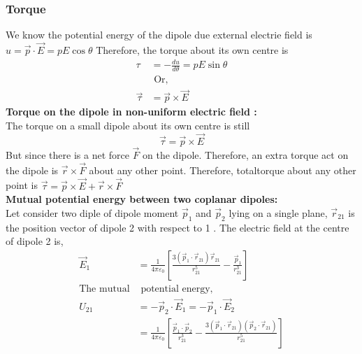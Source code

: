 \subsubsection{Torque}
We know the potential energy of the dipole due external electrie field is $u=\vec{p} \cdot \vec{E}=p E \cos \theta$
Therefore, the torque about its own centre is
$$
\begin{aligned}
\tau&=-\frac{d u}{d \theta}=p E \sin \theta\\
&\text { Or, }\\
\vec{\tau}&=\vec{p} \times \vec{E}
\end{aligned}
$$
\textbf{Torque on the dipole in non-uniform electric field :}\\
The torque on a small dipole about its own centre is still
$$
\vec{\tau}=\vec{p} \times \vec{E}
$$
But since there is a net force $\vec{F}$ on the dipole.
Therefore, an extra torque act on the dipole is $\vec{r} \times \vec{F}$ about any other point.
Therefore, totaltorque about any other point is $\vec{\tau}=\vec{p} \times \vec{E}+\vec{r} \times \vec{F}$\\
\textbf{Mutual potential energy between two coplanar dipoles:}\\
Let consider two diple of dipole moment $\vec{p}_{1}$ and $\vec{p}_{2}$ lying on a single plane, $\vec{r}_{21}$ is the position vector of dipole
2 with respect to 1 . The electric field at the centre of dipole 2 is,
\begin{align*}
\vec{E}_{1}&=\frac{1}{4 \pi \varepsilon_{0}}\left[\frac{3\left(\vec{p}_{1} \cdot \vec{r}_{21}\right) \vec{r}_{21}}{r_{21}^{5}}-\frac{\vec{p}_{1}}{r_{21}^{3}}\right]\\
\text{The mutual}&\text{ potential energy,}\\
U_{21}&=-\vec{p}_{2} \cdot \vec{E}_{1}=-\vec{p}_{1} \cdot \vec{E}_{2}\\&=\frac{1}{4 \pi \varepsilon_{0}}\left[\frac{\vec{p}_{1} \cdot \vec{p}_{2}}{r_{21}^{3}}-\frac{3\left(\vec{p}_{1} \cdot \vec{r}_{21}\right)\left(\vec{p}_{2} \cdot \vec{r}_{21}\right)}{r_{21}^{5}}\right]
\end{align*}



